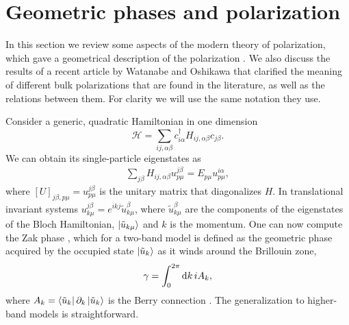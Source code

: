 \documentclass[twocolumn,amsmath,longbibliography,amssymb,superscriptaddress]{revtex4-1}
\begin{document}
\section{Geometric phases and polarization}

In this section we review some aspects of the modern theory of polarization, which gave a geometrical description of the polarization \cite{Resta1992,KingSmith1993,Vanderbilt1993,Resta1997}. 
We also discuss the results of a recent article by Watanabe and Oshikawa \cite{Watanabe2018} that clarified the meaning of different bulk polarizations that are found in the literature, as well as the relations between them. For clarity we will use the same notation they use. 

Consider a generic, quadratic Hamiltonian in one dimension
\begin{equation}\label{eq:quadr_Ham}
\mathcal{H} = \sum_{ij,\alpha\beta} c_{i\alpha}^\dagger H_{ij,\alpha \beta}c_{j\beta}.
\end{equation}
We can obtain its single-particle eigenstates as
\begin{align}
\sum_{j\beta}H_{ij,\alpha\beta} u_{p\mu}^{j\beta} = E_{p\mu} u^{i\alpha}_{p\mu},
\end{align}
where $[U]_{j\beta,p\mu} = u_{p\mu}^{j\beta}$ is the unitary matrix that diagonalizes $H$. In translational invariant systems $u_{k\mu}^{j\beta} = e^{ikj}\tilde{u}_{k \mu}^{\beta}$, where $\tilde{u}_{k \mu}^{\beta}$ are the components of the eigenstates of the Bloch Hamiltonian, $\ket{\tilde{u}_{k\mu}}$ and $k$ is the momentum. One can now compute the Zak phase \cite{Zak1989}, which for a two-band  model is defined as the geometric phase acquired by the occupied state $\ket{\tilde{u}_k}$ as it winds around the Brillouin zone,
\begin{equation}
\gamma = \int_{0}^{2\pi} {\rm d}k\, i A_k, 
\label{eq:zak_phase}
\end{equation}
where $A_k = \bra{\tilde{u}_k}\partial_k \ket{\tilde{u}_k}$ is the Berry connection \cite{Berry1984}. 
The generalization to higher-band models is straightforward. 
\end{document}
